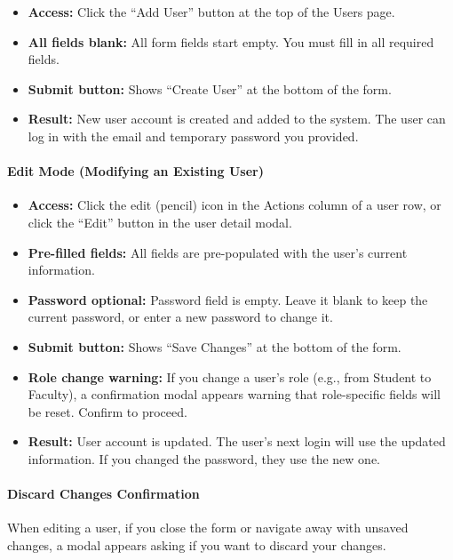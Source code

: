 \documentclass[12pt, a4paper]{article}
\begin{document}
\begin{itemize}[leftmargin=1.5em]
  \item \textbf{Access:} Click the ``Add User'' button at the top of the Users page.
  \item \textbf{All fields blank:} All form fields start empty. You must fill in all required fields.
  \item \textbf{Submit button:} Shows ``Create User'' at the bottom of the form.
  \item \textbf{Result:} New user account is created and added to the system. The user can log in with the email and temporary password you provided.
\end{itemize}
 
\paragraph{Edit Mode (Modifying an Existing User)}
 
\begin{itemize}[leftmargin=1.5em]
  \item \textbf{Access:} Click the edit (pencil) icon in the Actions column of a user row, or click the ``Edit'' button in the user detail modal.
  \item \textbf{Pre-filled fields:} All fields are pre-populated with the user's current information.
  \item \textbf{Password optional:} Password field is empty. Leave it blank to keep the current password, or enter a new password to change it.
  \item \textbf{Submit button:} Shows ``Save Changes'' at the bottom of the form.
  \item \textbf{Role change warning:} If you change a user's role (e.g., from Student to Faculty), a confirmation modal appears warning that role-specific fields will be reset. Confirm to proceed.
  \item \textbf{Result:} User account is updated. The user's next login will use the updated information. If you changed the password, they use the new one.
\end{itemize}
 
\paragraph{Discard Changes Confirmation}
 
When editing a user, if you close the form or navigate away with unsaved changes, a modal appears asking if you want to discard your changes.
 
\end{document}

